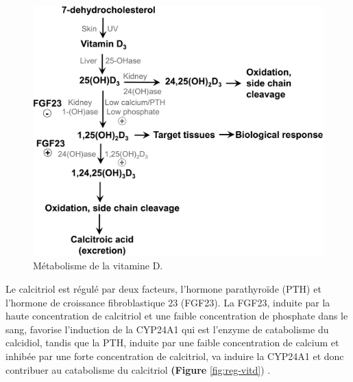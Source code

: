 \documentclass[
  a4paper,
  DIV=11,
  numbers=noendperiod,
  listof=totoc]{scrreprt}
\begin{document}
\begin{figure}

{\centering \includegraphics{figures/vitamin-d-metabolism.png}

}

\caption{\label{fig-metabolism-vitd}Métabolisme de la vitamine D.
\textcite{Norman.2008}}

\end{figure}

Le calcitriol est régulé par deux facteurs, l'hormone parathyroïde (PTH)
et l'hormone de croissance fibroblastique 23 (FGF23). La FGF23, induite
par la haute concentration de calcitriol et une faible concentration de
phosphate dans le sang, favorise l'induction de la CYP24A1 qui est
l'enzyme de catabolisme du calcidiol, tandis que la PTH, induite par une
faible concentration de calcium et inhibée par une forte concentration
de calcitriol, va induire la CYP24A1 et donc contribuer au catabolisme
du calcitriol \textbf{(Figure} \ref{fig:reg-vitd})
\autocite{Dankers.2017,Christakos.2010}.
\end{document}
